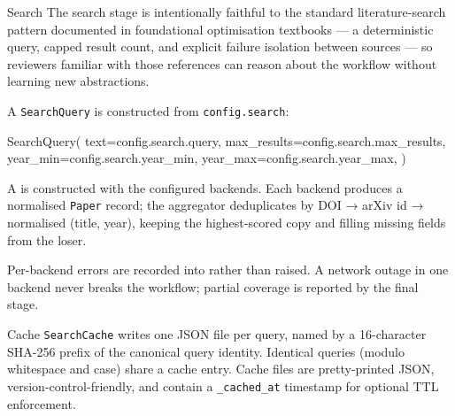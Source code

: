 \documentclass[
  ignorenonframetext,
]{beamer}
\newenvironment{Shaded}{}{}
\newcommand{\NormalTok}[1]{#1}
\newcommand{\OperatorTok}[1]{\textcolor[rgb]{0.40,0.40,0.40}{#1}}
\begin{document}
\begin{frame}{Search}
\protect{}\label{search}
The search stage is intentionally faithful to the standard
literature-search pattern documented in foundational optimisation
textbooks  --- a
deterministic query, capped result count, and explicit failure isolation
between sources --- so reviewers familiar with those references can
reason about the workflow without learning new abstractions.

A \texttt{SearchQuery} is constructed from \texttt{config.search}:

\begin{Shaded}
\begin{Highlighting}[]
\NormalTok{SearchQuery(}
\NormalTok{    text}\OperatorTok{=}\NormalTok{config.search.query,}
\NormalTok{    max\_results}\OperatorTok{=}\NormalTok{config.search.max\_results,}
\NormalTok{    year\_min}\OperatorTok{=}\NormalTok{config.search.year\_min,}
\NormalTok{    year\_max}\OperatorTok{=}\NormalTok{config.search.year\_max,}
\NormalTok{)}
\end{Highlighting}
\end{Shaded}

A  is constructed with the configured backends.
Each backend produces a normalised \texttt{Paper} record; the aggregator
deduplicates by DOI → arXiv id → normalised (title, year), keeping the
highest-scored copy and filling missing fields from the loser.

Per-backend errors are recorded into  rather
than raised. A network outage in one backend never breaks the workflow;
partial coverage is reported by the final stage.
\end{frame}

\begin{frame}{Cache}
\protect{}\label{cache}
\texttt{SearchCache} writes one JSON file per query, named by a
16-character SHA-256 prefix of the canonical query identity. Identical
queries (modulo whitespace and case) share a cache entry. Cache files
are pretty-printed JSON, version-control-friendly, and contain a
\texttt{\_cached\_at} timestamp for optional TTL enforcement.
\end{frame}
\end{document}
